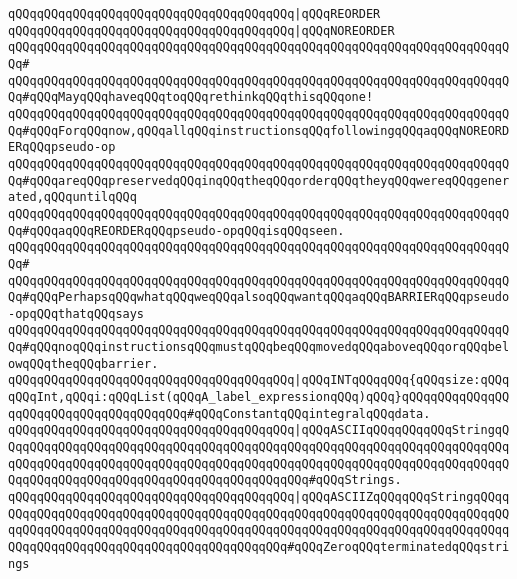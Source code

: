 \verb|qQQqqQQqqQQqqQQqqQQqqQQqqQQqqQQqqQQqqQQq|\verb#|qQQqREORDER#\newline
\verb|qQQqqQQqqQQqqQQqqQQqqQQqqQQqqQQqqQQqqQQq|\verb#|qQQqNOREORDER#\newline
\verb|qQQqqQQqqQQqqQQqqQQqqQQqqQQqqQQqqQQqqQQqqQQqqQQqqQQqqQQqqQQqqQQqqQQqqQQq#|\newline
\verb|qQQqqQQqqQQqqQQqqQQqqQQqqQQqqQQqqQQqqQQqqQQqqQQqqQQqqQQqqQQqqQQqqQQqqQQq#qQQqMayqQQqhaveqQQqtoqQQqrethinkqQQqthisqQQqone!|\newline
\verb|qQQqqQQqqQQqqQQqqQQqqQQqqQQqqQQqqQQqqQQqqQQqqQQqqQQqqQQqqQQqqQQqqQQqqQQq#qQQqForqQQqnow,qQQqallqQQqinstructionsqQQqfollowingqQQqaqQQqNOREORDERqQQqpseudo-op|\newline
\verb|qQQqqQQqqQQqqQQqqQQqqQQqqQQqqQQqqQQqqQQqqQQqqQQqqQQqqQQqqQQqqQQqqQQqqQQq#qQQqareqQQqpreservedqQQqinqQQqtheqQQqorderqQQqtheyqQQqwereqQQqgenerated,qQQquntilqQQq|\newline
\verb|qQQqqQQqqQQqqQQqqQQqqQQqqQQqqQQqqQQqqQQqqQQqqQQqqQQqqQQqqQQqqQQqqQQqqQQq#qQQqaqQQqREORDERqQQqpseudo-opqQQqisqQQqseen.|\newline
\verb|qQQqqQQqqQQqqQQqqQQqqQQqqQQqqQQqqQQqqQQqqQQqqQQqqQQqqQQqqQQqqQQqqQQqqQQq#|\newline
\verb|qQQqqQQqqQQqqQQqqQQqqQQqqQQqqQQqqQQqqQQqqQQqqQQqqQQqqQQqqQQqqQQqqQQqqQQq#qQQqPerhapsqQQqwhatqQQqweqQQqalsoqQQqwantqQQqaqQQqBARRIERqQQqpseudo-opqQQqthatqQQqsays|\newline
\verb|qQQqqQQqqQQqqQQqqQQqqQQqqQQqqQQqqQQqqQQqqQQqqQQqqQQqqQQqqQQqqQQqqQQqqQQq#qQQqnoqQQqinstructionsqQQqmustqQQqbeqQQqmovedqQQqaboveqQQqorqQQqbelowqQQqtheqQQqbarrier.|\newline
\newline
\newline
\newline
\verb|qQQqqQQqqQQqqQQqqQQqqQQqqQQqqQQqqQQqqQQq|\verb#|qQQqINTqQQqqQQq{qQQqsize:qQQqqQQqInt,qQQqi:qQQqList(qQQqA_label_expressionqQQq)qQQq}qQQqqQQqqQQqqQQqqQQqqQQqqQQqqQQqqQQqqQQq#\verb|#qQQqConstantqQQqintegralqQQqdata.|\newline
\newline
\newline
\verb|qQQqqQQqqQQqqQQqqQQqqQQqqQQqqQQqqQQqqQQq|\verb#|qQQqASCIIqQQqqQQqqQQqStringqQQqqQQqqQQqqQQqqQQqqQQqqQQqqQQqqQQqqQQqqQQqqQQqqQQqqQQqqQQqqQQqqQQqqQQqqQQqqQQqqQQqqQQqqQQqqQQqqQQqqQQqqQQqqQQqqQQqqQQqqQQqqQQqqQQqqQQqqQQqqQQqqQQqqQQqqQQqqQQqqQQqqQQqqQQqqQQqqQQqqQQq#\verb|#qQQqStrings.|\newline
\verb|qQQqqQQqqQQqqQQqqQQqqQQqqQQqqQQqqQQqqQQq|\verb#|qQQqASCIIZqQQqqQQqStringqQQqqQQqqQQqqQQqqQQqqQQqqQQqqQQqqQQqqQQqqQQqqQQqqQQqqQQqqQQqqQQqqQQqqQQqqQQqqQQqqQQqqQQqqQQqqQQqqQQqqQQqqQQqqQQqqQQqqQQqqQQqqQQqqQQqqQQqqQQqqQQqqQQqqQQqqQQqqQQqqQQqqQQqqQQqqQQqqQQqqQQq#\verb|#qQQqZeroqQQqterminatedqQQqstrings|\newline
